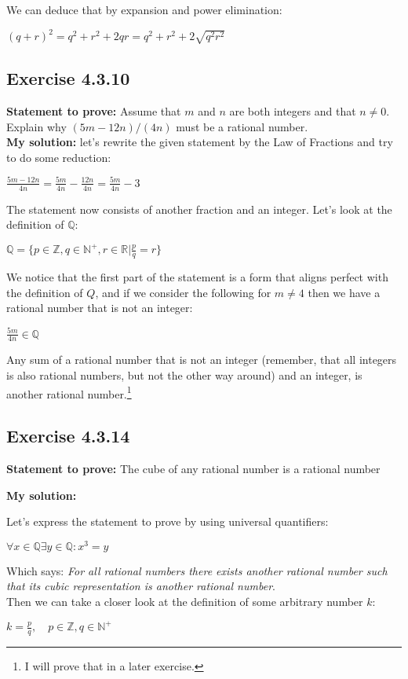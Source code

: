 \documentclass{article}
\newcommand{\cent}[1]{\begin{center}#1\end{center}}
\newcommand{\doubleR}{\mathbb{R}}
\newcommand{\doubleZ}{\mathbb{Z}}
\newcommand{\doubleN}{\mathbb{N}}
\newcommand{\doubleQ}{\mathbb{Q}}
\newcommand{\In}{\! \in \!}
\newcommand{\Prove}{\textbf{Statement to prove: }}
\newcommand{\Solution}{\textbf{My solution: }}
\newcommand{\QED}{\boxed{}}
\newcommand{\Exercise}[1]{\subsection*{Exercise #1}}
\begin{document}
	 We can deduce that by expansion and power elimination:
	 
	\cent{$(q+r)^2 = q^2+r^2 + 2qr =q^2+r^2 + 2\sqrt{q^2 r^2} $}
	
	\QED	 
	
	\Exercise{4.3.10}
	
	\Prove
	Assume that $m$ and $n$ are both integers and that  $n\neq 0$. Explain why $(5m -12n)/(4n)$ must be a rational number.\\
	
	\Solution
	let's rewrite the given statement by the Law of Fractions and try to do some reduction:
	
	\cent{$\frac{5m-12n}{4n} = \frac{5m}{4n} - \frac{12n}{4n} = \frac{5m}{4n} - 3 $}
	
	The statement now consists of another fraction and an integer. Let's look at the definition of $\doubleQ$:
	
	\cent{$\doubleQ = \{p \in \doubleZ, q \in \doubleN^+, r \in \doubleR | \frac{p}{q} = r\}$}
	
	We notice that the first part of the statement is a form that aligns perfect with the definition of $Q$, and if we consider the following for $m \neq 4$ then we have a rational number that is not an integer:
	
	\cent{$\frac{5m}{4n} \in \doubleQ$} 
	
	Any sum of a rational number that is not an integer (remember, that all integers is also rational numbers, but not the other way around) and an integer, is another rational number.\footnote{I will prove that in a later exercise.}\\
	\QED
	
	\Exercise{4.3.14}
	
	\Prove
	The cube of any rational number is a rational number
	
	\Solution
	
	Let's express the statement to prove by using universal quantifiers:
	
	\cent{$\forall x \In \doubleQ \exists y \In \doubleQ : x^3 = y$}
	
	Which says: \textit{For all rational numbers there exists another rational number such that its cubic representation is another rational number}.\\
	
	Then we can take a closer look at the definition of some arbitrary number $k$:
	
	\cent{$k = \frac{p}{q}, \quad p \In \doubleZ, q \In \doubleN^+$}
	
\end{document}

